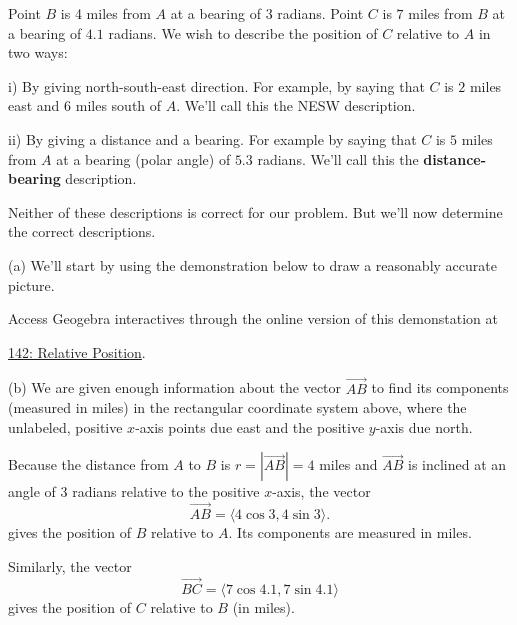 \documentclass{ximera}
\begin{document}
\begin{example}  \label{Edsa5454v:Vectors}
Point $B$ is 4 miles from $A$ at a bearing of $3$ radians. Point $C$ is $7$ miles from $B$ at a bearing of $4.1$ radians. We wish to describe the position of $C$ relative to $A$ in two ways:

i) By giving north-south-east direction. For example, by saying that $C$ is $2$ miles east and $6$ miles south of $A$. We'll call this the NESW description.

ii) By giving a distance and a bearing. For example by saying that $C$ is $5$ miles from $A$ at a bearing (polar angle) of $5.3$ radians. We'll call this the {\bf distance-bearing} description.

Neither of these descriptions is correct for our problem. But we'll now determine the correct descriptions.

\begin{explanation}

(a) We'll start by using the demonstration below to draw a reasonably accurate picture. %


Access Geogebra interactives through the online version of this demonstation at
 
\href{https://www.geogebra.org/classic/bhdsgxtx}{142: Relative Position}.

 
\begin{onlineOnly}
    \begin{center}
\end{center}
\end{onlineOnly}


(b) We are given enough information about the vector $\overrightarrow{AB}$ to find its components (measured in miles) in the rectangular coordinate system above, where the unlabeled, positive $x$-axis points due east and the positive $y$-axis due north.

Because the distance from $A$ to $B$ is $r=  |\overrightarrow{AB}| = 4$ miles and $\overrightarrow{AB}$ is inclined at an angle of $3$ radians relative to the positive $x$-axis, the vector
\[
       \overrightarrow{AB} = \langle 4 \cos 3, 4 \sin 3\rangle .
\]
gives the position of $B$ relative to $A$. Its components are measured in miles.

Similarly, the vector
\[
   \overrightarrow{BC} = \langle 7 \cos 4.1, 7 \sin 4.1\rangle
\]
gives the position of $C$ relative to $B$ (in miles).


\end{explanation}
\end{example}
\end{document}
